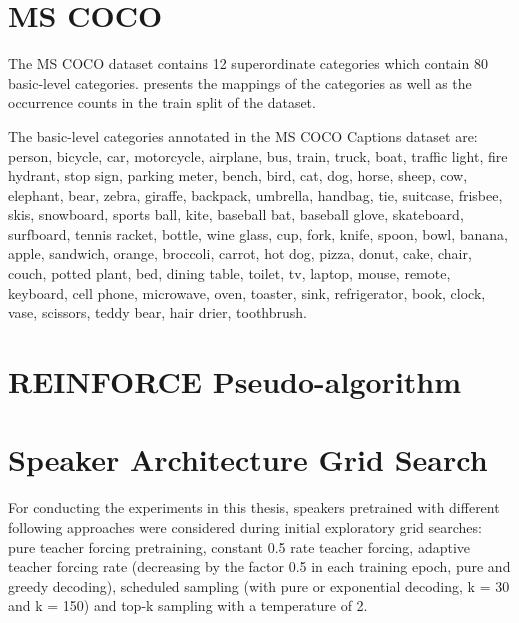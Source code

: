 \section{MS COCO}
The MS COCO dataset \parencite{chen2015microsoft} contains 12 superordinate categories which contain 80 basic-level categories.  presents the mappings of the categories as well as the occurrence counts in the train split of the dataset. 

The basic-level categories annotated in the MS COCO Captions dataset are: person, bicycle, car, motorcycle, airplane, bus, train, truck, boat, traffic light, fire hydrant, stop sign, parking meter, bench, bird, cat, dog, horse, sheep, cow, elephant, bear, zebra, giraffe, backpack, umbrella, handbag, tie, suitcase, frisbee, skis, snowboard, sports ball, kite, baseball bat, baseball glove, skateboard, surfboard, tennis racket, bottle, wine glass, cup, fork, knife, spoon, bowl, banana, apple, sandwich, orange, broccoli, carrot, hot dog, pizza, donut, cake, chair, couch, potted plant, bed, dining table, toilet, tv, laptop, mouse, remote, keyboard, cell phone, microwave, oven, toaster, sink, refrigerator, book, clock, vase, scissors, teddy bear, hair drier, toothbrush.


\section{REINFORCE Pseudo-algorithm}

\section{Speaker Architecture Grid Search}
\label{app:grid_search}

For conducting the experiments in this thesis, speakers pretrained with different following approaches were considered during initial exploratory grid searches: pure teacher forcing pretraining, constant 0.5 rate teacher forcing, adaptive teacher forcing rate (decreasing by the factor 0.5 in each training epoch, pure and greedy decoding), scheduled sampling (with pure or exponential decoding, k = 30 and k = 150) and top-k sampling with a temperature of 2.


